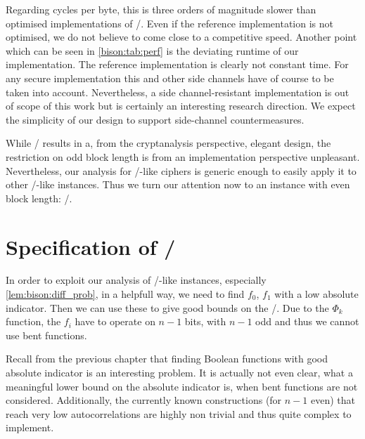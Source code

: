 Regarding cycles per byte, this is three orders of magnitude slower than optimised implementations of \AES/\@.
Even if the reference implementation is not optimised, we do not believe to come close to a competitive speed.
Another point which can be seen in \cref{bison:tab:perf} is the deviating runtime of our implementation.
The reference implementation is clearly not constant time. %
For any secure implementation this and other side channels have of course to be taken into account.
Nevertheless, a side channel-resistant implementation is out of scope of this work but is certainly an interesting research direction.
We expect the simplicity of our design to support side-channel countermeasures.

While \bison/ results in a, from the cryptanalysis perspective, elegant design, the restriction on odd block length is from an implementation perspective unpleasant.
Nevertheless, our analysis for \bison/-like ciphers is generic enough to easily apply it to other \bison/-like instances.
Thus we turn our attention now to an instance with even block length: \wisent/.

\section{Specification of \wisent/}\label{sec:wisent:instance}

In order to exploit our analysis of \bison/-like instances, especially \cref{lem:bison:diff_prob}, in a helpfull way, we need to find $f_0$, $f_1$ with a low absolute indicator.
Then we can use these to give good bounds on the \EDP/.
Due to the $\Phi_k$ function, the $f_i$ have to operate on $n-1$ bits, with $n-1$ odd and thus we cannot use bent functions.

Recall from the previous chapter that finding Boolean functions with good absolute indicator is an interesting problem.
It is actually not even clear, what a meaningful lower bound on the absolute indicator is, when bent functions are not considered.
Additionally, the currently known constructions (for $n-1$ even) that reach very low autocorrelations are highly non trivial and thus quite complex to implement.

